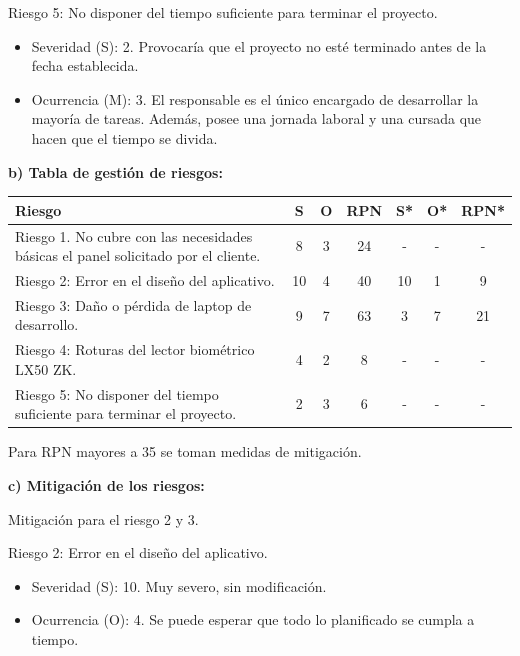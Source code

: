 \documentclass[
11pt, %
]{charter}
\begin{document}
Riesgo 5: No disponer del tiempo suficiente para terminar el proyecto.
\begin{itemize}
\item Severidad (S): 2. Provocaría que el proyecto no esté terminado antes de la fecha establecida.
\item Ocurrencia (M): 3. El responsable es el único encargado de desarrollar la mayoría de tareas. Además, posee una jornada laboral y una cursada que hacen que el tiempo se divida.
\end{itemize}


\textbf{b) Tabla de gestión de riesgos:}

\begin{table}[htpb]
\centering
\begin{tabularx}{\linewidth}{@{}|X|c|c|c|c|c|c|@{}}
\hline
\rowcolor[HTML]{C0C0C0} 
Riesgo & S & O & RPN & S* & O* & RPN* \\ \hline
Riesgo 1. No cubre con las necesidades básicas el panel solicitado por el cliente. & 8  & 3  & \cellcolor[HTML]{39ff14}24   & - & - & - \\ \hline
Riesgo 2: Error en el diseño del aplicativo. & 10  & 4  & \cellcolor[HTML]{F1948A}40 & 10 & 1 & \cellcolor[HTML]{39ff14}9 \\ \hline
Riesgo 3: Daño o pérdida de laptop de desarrollo. & 9  & 7  & \cellcolor[HTML]{F1948A}63  &  3  &  7  &  \cellcolor[HTML]{39ff14}21 \\ \hline
Riesgo 4: Roturas del lector biométrico LX50 ZK. &  4 & 2  &  \cellcolor[HTML]{39ff14}8  & - & - & -  \\ \hline
Riesgo 5: No disponer del tiempo suficiente para terminar el proyecto. & 2  & 3  & \cellcolor[HTML]{39ff14}6 & - & -   & -  \\ \hline
\end{tabularx}%
\end{table}

Para RPN mayores a 35 se toman medidas de mitigación.

\textbf{c) Mitigación de los riesgos:}

Mitigación para el riesgo 2 y 3.

Riesgo 2: Error en el diseño del aplicativo.
\begin{itemize}
\item Severidad (S): 10. Muy severo, sin modificación.
\item Ocurrencia (O): 4. Se puede esperar que todo lo planificado se cumpla a tiempo.
\end{itemize}
\end{document}
